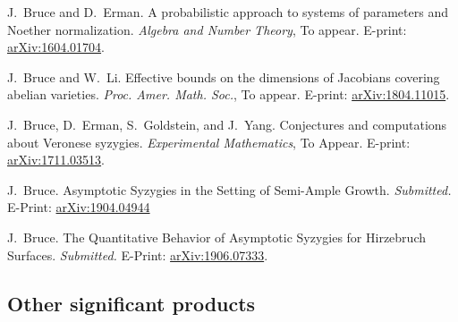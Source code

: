 \documentclass[11pt]{article}
\begin{document}
\begin{bibenum}[itemsep=5pt]

    \item
	J.~Bruce and D.~Erman. A probabilistic approach to systems of parameters and Noether normalization. {\it Algebra and Number Theory}, To appear. E-print: \hyperref{http://arxiv.org/abs/1604.01704}{}{}{arXiv:1604.01704}.
	
\item
	J.~Bruce and W.~Li. Effective bounds on the dimensions of Jacobians covering abelian varieties.  {\it Proc. Amer. Math. Soc.}, To appear. E-print: \hyperref{https://arxiv.org/abs/1804.11015}{}{}{arXiv:1804.11015}.
			
\item
	J.~Bruce, D.~Erman, S.~Goldstein, and J.~Yang. Conjectures and computations about Veronese syzygies.  {\it Experimental Mathematics}, To Appear. E-print: \hyperref{https://arxiv.org/abs/1711.03513}{}{}{arXiv:1711.03513}.

\item
	J.~Bruce. Asymptotic Syzygies in the Setting of Semi-Ample Growth. {\it Submitted.}\\ E-Print:  \hyperref{https://arxiv.org/abs/1904.04944}{}{}{arXiv:1904.04944}

\item
	J.~Bruce. The Quantitative Behavior of Asymptotic Syzygies for Hirzebruch Surfaces. {\it Submitted.} E-Print:  \hyperref{http://arxiv.org/abs/1906.07333}{}{}{arXiv:1906.07333}.
	
	
\end{bibenum}

\subsection{Other significant products}
\end{document}
